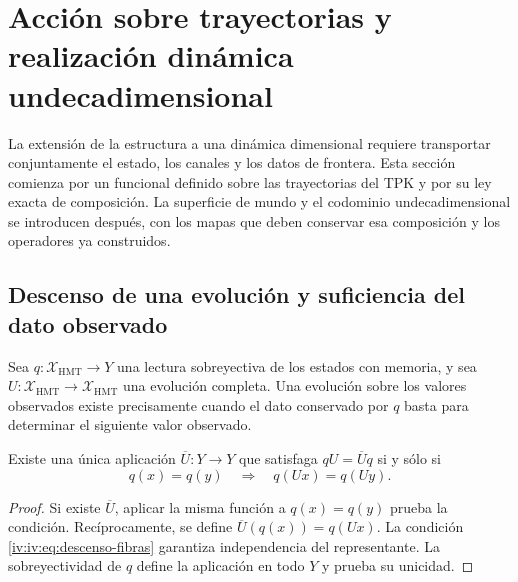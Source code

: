 \section{Acción sobre trayectorias y realización dinámica undecadimensional}
\label{iv:iv:accion-realizacion}

La extensión de la estructura a una dinámica dimensional requiere
transportar conjuntamente el estado, los canales y los datos de
frontera. Esta sección comienza por un funcional definido sobre
las trayectorias del TPK y por su ley exacta de composición.
La superficie de mundo y el codominio undecadimensional se
introducen después, con los mapas que deben conservar esa
composición y los operadores ya construidos.

\subsection{Descenso de una evolución y suficiencia del dato observado}

Sea \(q:\mathcal X_{\mathrm{HMT}}\to Y\) una lectura
sobreyectiva de los estados con memoria, y sea
\(U:\mathcal X_{\mathrm{HMT}}\to\mathcal X_{\mathrm{HMT}}\)
una evolución completa. Una evolución sobre los valores
observados existe precisamente cuando el dato conservado por
\(q\) basta para determinar el siguiente valor observado.

\begin{theorem}
\label{iv:iv:thm:descenso-fibras}
Existe una única aplicación \(\overline U:Y\to Y\)
que satisfaga \(qU=\overline Uq\) si y sólo si
\begin{equation}
 q(x)=q(y)\quad\Longrightarrow\quad q(Ux)=q(Uy).
 \label{iv:iv:eq:descenso-fibras}
\end{equation}
\end{theorem}
\begin{proof}
Si existe \(\overline U\), aplicar la misma función a
\(q(x)=q(y)\) prueba la condición. Recíprocamente, se
define \(\overline U(q(x))=q(Ux)\). La condición
\eqref{iv:iv:eq:descenso-fibras} garantiza independencia del
representante. La sobreyectividad de \(q\) define la
aplicación en todo \(Y\) y prueba su unicidad.
\end{proof}

